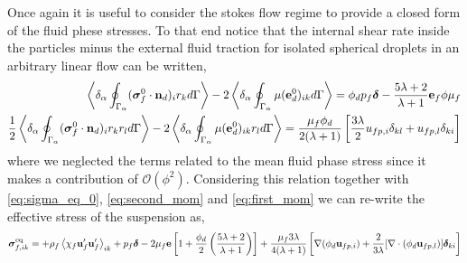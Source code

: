 Once again it is useful to consider the stokes flow regime to provide a closed form of the fluid phese stresses. 
To that end notice that the internal shear rate inside the particles minus the external fluid traction for isolated spherical droplets in an arbitrary linear flow can be written, 
\begin{align*}
    \left<\delta_\alpha \oint_{\Gamma_\alpha} (\bm{\sigma}_f^0 \cdot \textbf{n}_d)_ir_k d\Gamma\right> -
    2\left<\delta_\alpha \oint_{\Gamma_\alpha} {\mu(\textbf{e}_d^0)_{ik}} d\Gamma\right> 
    = 
    \phi_d p_f\bm\delta
    - \frac{5\lambda +2}{\lambda +1}
    \textbf{e}_f \phi \mu_f
    \\
    \frac{1}{2}\left<\delta_\alpha \oint_{\Gamma_\alpha} (\bm{\sigma}_f^0 \cdot \textbf{n}_d)_ir_kr_l d\Gamma\right> -
    2\left<\delta_\alpha \oint_{\Gamma_\alpha} {\mu(\textbf{e}_d^0)_{ik} r_l} d\Gamma\right> 
    = 
    \frac{\mu_f\phi_d}{2(\lambda +1) }
    \left[
        \frac{3\lambda}{2} 
        u_{fp,i}\delta_{kl}
        +  u_{fp,l}\delta_{ki}
    \right]
\end{align*}
where we neglected the terms related to the mean fluid phase stress since it makes a contribution of $\mathcal{O}(\phi^2)$\citet{jackson1997locally}.
Considering this relation together with \ref{eq:sigma_eq_0}, \ref{eq:second_mom} and \ref{eq:first_mom} we can re-write the effective stress of the suspension as, 
\begin{align*}
    \bm{\sigma}^\text{eq}_{f,ik} =
    + \rho_f\left<\chi_f\textbf{u}_f'\textbf{u}_f'\right>_{ik} 
    + p_f \bm\delta
    - 2 \mu_f \textbf{e}\left[
        1
        +\frac{\phi_d}{2}\left(
            \frac{5\lambda +2}{\lambda +1}
        \right)
    \right]
    + 
    \frac{\mu_f 3\lambda}{4(\lambda +1) }
    \left[
        \mathbf{\nabla} (\phi_d\textbf{u}_{fp,i})
        +  
        \frac{2}{3\lambda} 
        [\mathbf{\nabla}\cdot (\phi_d\textbf{u}_{fp,l})]\bm\delta_{ki}
    \right]
\end{align*} 
